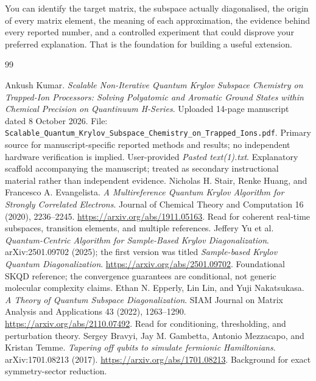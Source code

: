\documentclass[11pt,a4paper,oneside]{report}
\begin{document}
\begin{idea}
You can identify the target matrix, the subspace actually diagonalised, the origin of every matrix element, the meaning of each approximation, the evidence behind every reported number, and a controlled experiment that could disprove your preferred explanation. That is the foundation for building a useful extension.
\end{idea}

\begin{thebibliography}{99}
 Ankush Kumar. \textit{Scalable Non-Iterative Quantum Krylov Subspace Chemistry on Trapped-Ion Processors: Solving Polyatomic and Aromatic Ground States within Chemical Precision on Quantinuum H-Series}. Uploaded 14-page manuscript dated 8 October 2026. File: \texttt{Scalable\_Quantum\_Krylov\_Subspace\_Chemistry\_on\_Trapped\_Ions.pdf}. Primary source for manuscript-specific reported methods and results; no independent hardware verification is implied.
 User-provided \textit{Pasted text(1).txt}. Explanatory scaffold accompanying the manuscript; treated as secondary instructional material rather than independent evidence.
 Nicholas H. Stair, Renke Huang, and Francesco A. Evangelista. \textit{A Multireference Quantum Krylov Algorithm for Strongly Correlated Electrons}. Journal of Chemical Theory and Computation 16 (2020), 2236--2245. \url{https://arxiv.org/abs/1911.05163}. Read for coherent real-time subspaces, transition elements, and multiple references.
 Jeffery Yu et al. \textit{Quantum-Centric Algorithm for Sample-Based Krylov Diagonalization}. arXiv:2501.09702 (2025); the first version was titled \textit{Sample-based Krylov Quantum Diagonalization}. \url{https://arxiv.org/abs/2501.09702}. Foundational SKQD reference; the convergence guarantees are conditional, not generic molecular complexity claims.
 Ethan N. Epperly, Lin Lin, and Yuji Nakatsukasa. \textit{A Theory of Quantum Subspace Diagonalization}. SIAM Journal on Matrix Analysis and Applications 43 (2022), 1263--1290. \url{https://arxiv.org/abs/2110.07492}. Read for conditioning, thresholding, and perturbation theory.
 Sergey Bravyi, Jay M. Gambetta, Antonio Mezzacapo, and Kristan Temme. \textit{Tapering off qubits to simulate fermionic Hamiltonians}. arXiv:1701.08213 (2017). \url{https://arxiv.org/abs/1701.08213}. Background for exact symmetry-sector reduction.

\end{thebibliography}
\end{document}
